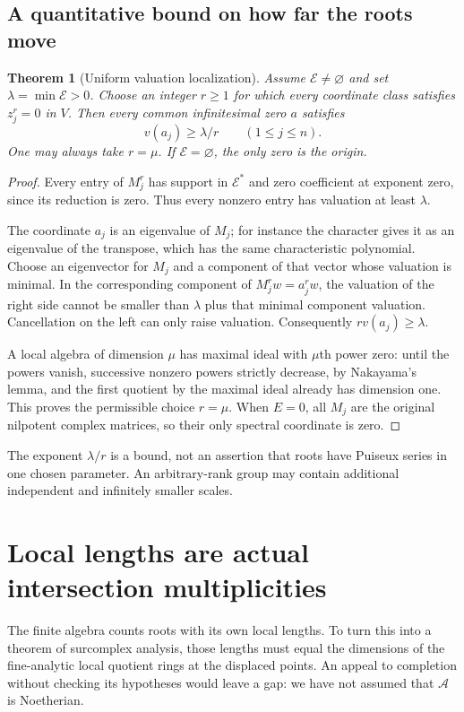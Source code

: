 \documentclass[11pt,letterpaper]{article}
\newtheorem{theorem}{Theorem}[section]
\theoremstyle{definition}
\theoremstyle{remark}
\newcommand{\A}{\mathscr A}
\newcommand{\EE}{\mathcal E}
\numberwithin{equation}{section}
\begin{document}
\subsection{A quantitative bound on how far the roots move}
\begin{theorem}[Uniform valuation localization]\label{thm:localization}
Assume $\EE\ne\varnothing$ and set $\lambda=\min\EE>0$. Choose an integer $r\geq1$ for which every coordinate class satisfies $z_j^r=0$ in $V$. Then every common infinitesimal zero $a$ satisfies
\begin{equation}\label{eq:rootbound}
 v(a_j)\geq\lambda/r\qquad(1\leq j\leq n).
\end{equation}
One may always take $r=\mu$. If $\EE=\varnothing$, the only zero is the origin.
\end{theorem}
\begin{proof}
Every entry of $M_j^r$ has support in $\EE^*$ and zero coefficient at exponent zero, since its reduction is zero. Thus every nonzero entry has valuation at least $\lambda$.

The coordinate $a_j$ is an eigenvalue of $M_j$; for instance the character gives it as an eigenvalue of the transpose, which has the same characteristic polynomial. Choose an eigenvector for $M_j$ and a component of that vector whose valuation is minimal. In the corresponding component of $M_j^r w=a_j^r w$, the valuation of the right side cannot be smaller than $\lambda$ plus that minimal component valuation. Cancellation on the left can only raise valuation. Consequently $rv(a_j)\geq\lambda$.

A local algebra of dimension $\mu$ has maximal ideal with $\mu$th power zero: until the powers vanish, successive nonzero powers strictly decrease, by Nakayama's lemma, and the first quotient by the maximal ideal already has dimension one. This proves the permissible choice $r=\mu$. When $E=0$, all $M_j$ are the original nilpotent complex matrices, so their only spectral coordinate is zero.
\end{proof}
The exponent $\lambda/r$ is a bound, not an assertion that roots have Puiseux series in one chosen parameter. An arbitrary-rank group may contain additional independent and infinitely smaller scales.

\section{Local lengths are actual intersection multiplicities}\label{sec:multiplicity}
The finite algebra counts roots with its own local lengths. To turn this into a theorem of surcomplex analysis, those lengths must equal the dimensions of the fine-analytic local quotient rings at the displaced points. An appeal to completion without checking its hypotheses would leave a gap: we have not assumed that $\A$ is Noetherian.
\end{document}
